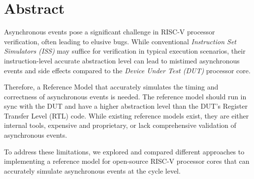 \chapter{Abstract}





Asynchronous events pose a significant challenge in RISC-V processor verification, often leading to elusive bugs. While conventional \textit{Instruction Set Simulators (ISS)} may suffice for verification in typical execution scenarios, their instruction-level accurate abstraction level can lead to mistimed asynchronous events and side effects compared to the \textit{Device Under Test (DUT)} processor core.


Therefore, a Reference Model that accurately simulates the timing and correctness of asynchronous events is needed. The reference model should run in sync with the DUT and have a higher abstraction level than the DUT's Register Transfer Level (RTL) code. 
While existing reference models exist, they are either internal tools, expensive and proprietary, or lack comprehensive validation of asynchronous events. 

To address these limitations, we explored and compared different approaches to implementing a reference model for open-source RISC-V processor cores that can accurately simulate asynchronous events at the cycle level. 

